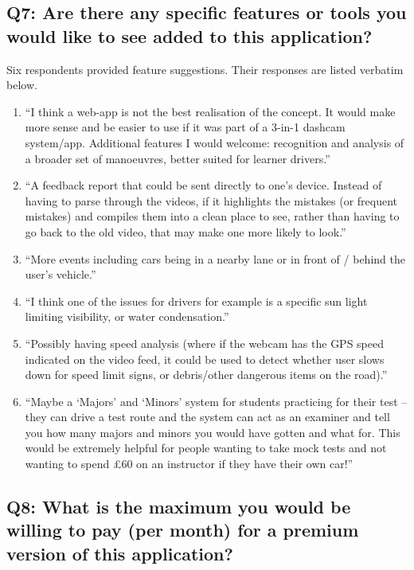 \documentclass{article}
\begin{document}
\subsection*{Q7: Are there any specific features or tools you would like to see added to this application?}
Six respondents provided feature suggestions. Their responses are listed verbatim below.

\begin{enumerate}
\item ``I think a web-app is not the best realisation of the concept. It would make more sense and be easier to use if it was part of a 3-in-1 dashcam system/app. Additional features I would welcome: recognition and analysis of a broader set of manoeuvres, better suited for learner drivers.''

\item ``A feedback report that could be sent directly to one's device. Instead of having to parse through the videos, if it highlights the mistakes (or frequent mistakes) and compiles them into a clean place to see, rather than having to go back to the old video, that may make one more likely to look.''

\item ``More events including cars being in a nearby lane or in front of / behind the user's vehicle.''

\item ``I think one of the issues for drivers for example is a specific sun light limiting visibility, or water condensation.''

\item ``Possibly having speed analysis (where if the webcam has the GPS speed indicated on the video feed, it could be used to detect whether user slows down for speed limit signs, or debris/other dangerous items on the road).''

\item ``Maybe a `Majors' and `Minors' system for students practicing for their test -- they can drive a test route and the system can act as an examiner and tell you how many majors and minors you would have gotten and what for. This would be extremely helpful for people wanting to take mock tests and not wanting to spend \pounds60 on an instructor if they have their own car!''
\end{enumerate}

\subsection*{Q8: What is the maximum you would be willing to pay (per month) for a premium version of this application?}
\end{document}

